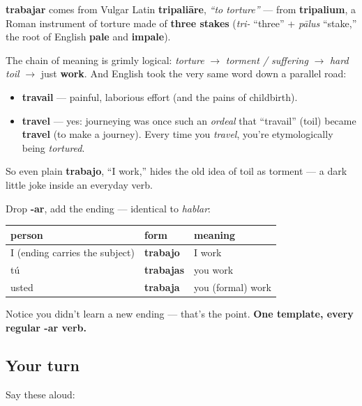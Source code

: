 \begin{cousinweb}
\textbf{trabajar} comes from Vulgar Latin \textbf{tripaliāre}, \emph{\textquotedblleft{}to torture\textquotedblright{}} — from \textbf{tripalium}, a Roman instrument of torture made of \textbf{three stakes} (\emph{tri-} \textquotedblleft{}three\textquotedblright{} + \emph{pālus} \textquotedblleft{}stake,\textquotedblright{} the root of English \textbf{pale} and \textbf{impale}).

The chain of meaning is grimly logical: \emph{torture} $\to$ \emph{torment / suffering} $\to$ \emph{hard toil} $\to$ just \textbf{work}. And English took the very same word down a parallel road:

\begin{itemize}
\raggedright
  \item \textbf{travail} — painful, laborious effort (and the pains of childbirth).
  \item \textbf{travel} — yes: journeying was once such an \emph{ordeal} that \textquotedblleft{}travail\textquotedblright{} (toil) became \textbf{travel} (to make a journey). Every time you \emph{travel}, you're etymologically being \emph{tortured}.
\end{itemize}

So even plain \textbf{trabajo}, “I work,” hides the old idea of toil as torment — a dark little joke inside an everyday verb.
\end{cousinweb}

\begin{grammarlens}[title={Grammar Lens: same -ar template}]
Drop \textbf{-ar}, add the ending — identical to \emph{hablar}:

\noindent
\begin{tabularx}{\linewidth}{@{}>{\raggedright\arraybackslash}X>{\raggedright\arraybackslash}X>{\raggedright\arraybackslash}X@{}}
\toprule
\textbf{person} & \textbf{form} & \textbf{meaning} \\
\midrule
I (ending carries the subject) & \textbf{trabajo} & I work \\
tú & \textbf{trabajas} & you work \\
usted & \textbf{trabaja} & you (formal) work \\
\bottomrule
\end{tabularx}

Notice you didn't learn a new ending — that's the point. \textbf{One template, every regular -ar verb.}
\end{grammarlens}

\subsection*{Your turn}
Say these aloud:


